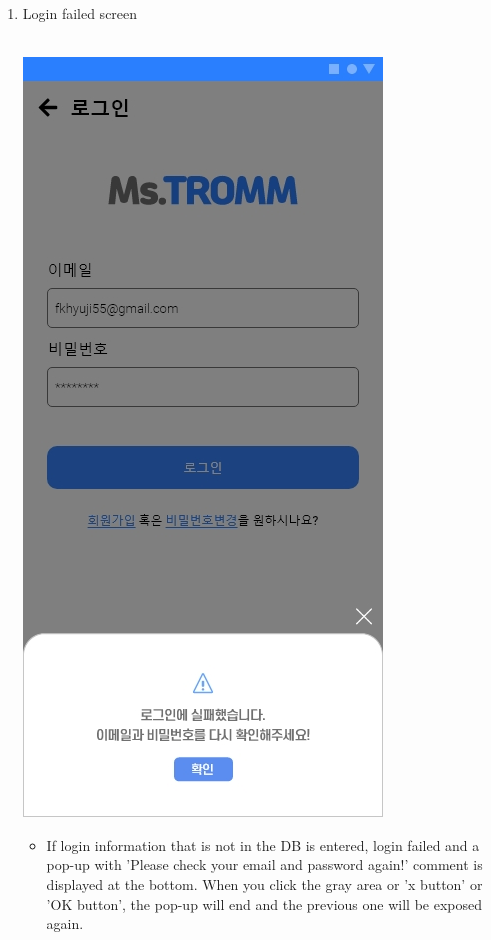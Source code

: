 \documentclass[conference]{IEEEtran}
\begin{document}
\begin{enumerate}
\begin{itemize}
    \end{itemize}
    \item Login failed screen \\\\
    \centerline{\includegraphics[scale=0.32]{3-1. 로그인 실패.jpg}}
    \begin{itemize}
    \item[] If login information that is not in the DB is entered, login failed and a pop-up with 'Please check your email and password again!' comment is displayed at the bottom. When you click the gray area or 'x button' or 'OK button', the pop-up will end and the previous one will be exposed again. \\ \\
    \end{itemize}

\end{enumerate}
\end{document}
